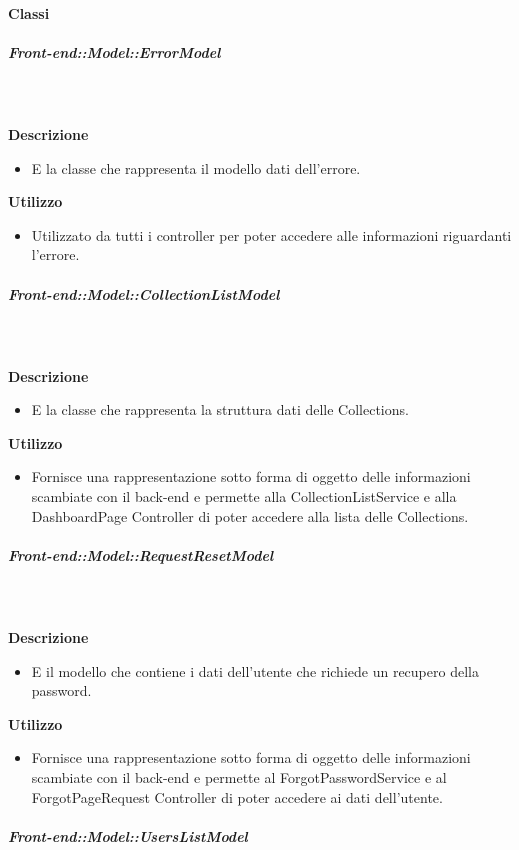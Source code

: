     \paragraph{Classi}
      \subparagraph{Front-end::Model::ErrorModel}
        
        \textbf{\\ \\ Descrizione} 
          \begin{itemize}
            \item[] E la classe che rappresenta il modello dati dell'errore.
          \end{itemize}      
        \textbf{Utilizzo}  
          \begin{itemize}
            \item[] Utilizzato da tutti i controller per poter accedere alle informazioni riguardanti l'errore.
          \end{itemize}
      \subparagraph{Front-end::Model::CollectionListModel}
        
        \textbf{\\ \\ Descrizione} 
          \begin{itemize}
            \item[] E la classe che rappresenta la struttura dati delle Collections.
          \end{itemize}      
        \textbf{Utilizzo}  
          \begin{itemize}
            \item[] Fornisce una rappresentazione sotto forma di oggetto delle informazioni scambiate con il back-end e permette alla CollectionListService e alla DashboardPage Controller di poter accedere alla lista delle Collections.
          \end{itemize}
      \subparagraph{Front-end::Model::RequestResetModel}
        
        \textbf{\\ \\ Descrizione} 
          \begin{itemize}
            \item[] E il modello che contiene i dati dell'utente che richiede un recupero della password.
          \end{itemize}      
        \textbf{Utilizzo}  
          \begin{itemize}
            \item[] Fornisce una rappresentazione sotto forma di oggetto delle informazioni scambiate con il back-end e permette al ForgotPasswordService e al ForgotPageRequest Controller di poter accedere ai dati dell'utente.
          \end{itemize}
      \subparagraph{Front-end::Model::UsersListModel}
        
